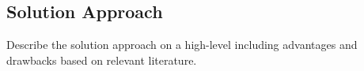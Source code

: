 \subsection{Solution Approach}
Describe the solution approach on a high-level including advantages and drawbacks based on relevant literature.
